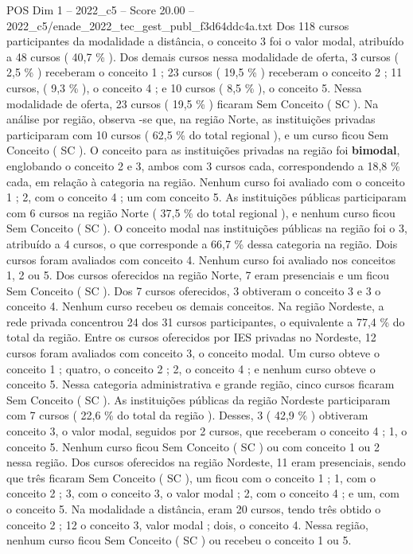 \begin{textsample}{POS Dim 1 – 2022\_c5 – Score 20.00 – 2022\_c5/enade\_2022\_tec\_gest\_publ\_f3d64ddc4a.txt}
Dos 118 cursos participantes da modalidade a distância, o conceito 3 foi o valor modal, atribuído a 48 cursos ( 40,7 \% ).
Dos demais cursos nessa modalidade de oferta, 3 cursos ( 2,5 \% ) receberam o conceito 1 ; 23 cursos ( 19,5 \% ) receberam o conceito 2 ; 11 cursos, ( 9,3 \% ), o conceito 4 ; e 10 cursos ( 8,5 \% ), o conceito 5.
Nessa modalidade de oferta, 23 cursos ( 19,5 \% ) ficaram Sem Conceito ( SC ).
Na análise por região, observa -se que, na região Norte, as instituições privadas participaram com 10 cursos ( 62,5 \% do total regional ), e um curso ficou Sem Conceito ( SC ).
O conceito para as instituições privadas na região foi \textbf{bimodal}, englobando o conceito 2 e 3, ambos com 3 cursos cada, correspondendo a 18,8 \% cada, em relação à categoria na região.
Nenhum curso foi avaliado com o conceito 1 ; 2, com o conceito 4 ; um com conceito 5.
As instituições públicas participaram com 6 cursos na região Norte ( 37,5 \% do total regional ), e nenhum curso ficou Sem Conceito ( SC ).
O conceito modal nas instituições públicas na região foi o 3, atribuído a 4 cursos, o que corresponde a 66,7 \% dessa categoria na região.
Dois cursos foram avaliados com conceito 4.
Nenhum curso foi avaliado nos conceitos 1, 2 ou 5.
Dos cursos oferecidos na região Norte, 7 eram presenciais e um ficou Sem Conceito ( SC ).
Dos 7 cursos oferecidos, 3 obtiveram o conceito 3 e 3 o conceito 4.
Nenhum curso recebeu os demais conceitos.
Na região Nordeste, a rede privada concentrou 24 dos 31 cursos participantes, o equivalente a 77,4 \% do total da região.
Entre os cursos oferecidos por IES privadas no Nordeste, 12 cursos foram avaliados com conceito 3, o conceito modal.
Um curso obteve o conceito 1 ; quatro, o conceito 2 ; 2, o conceito 4 ; e nenhum curso obteve o conceito 5.
Nessa categoria administrativa e grande região, cinco cursos ficaram Sem Conceito ( SC ).
As instituições públicas da região Nordeste participaram com 7 cursos ( 22,6 \% do total da região ).
Desses, 3 ( 42,9 \% ) obtiveram conceito 3, o valor modal, seguidos por 2 cursos, que receberam o conceito 4 ; 1, o conceito 5.
Nenhum curso ficou Sem Conceito ( SC ) ou com conceito 1 ou 2 nessa região.
Dos cursos oferecidos na região Nordeste, 11 eram presenciais, sendo que três ficaram Sem Conceito ( SC ), um ficou com o conceito 1 ; 1, com o conceito 2 ; 3, com o conceito 3, o valor modal ; 2, com o conceito 4 ; e um, com o conceito 5.
Na modalidade a distância, eram 20 cursos, tendo três obtido o conceito 2 ; 12 o conceito 3, valor modal ; dois, o conceito 4.
Nessa região, nenhum curso ficou Sem Conceito ( SC ) ou recebeu o conceito 1 ou 5.

\end{textsample}
